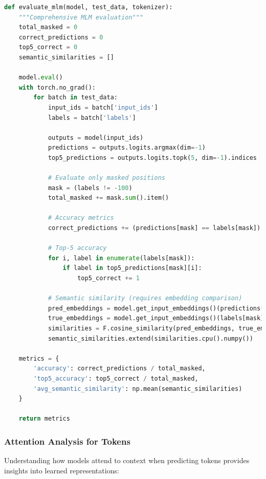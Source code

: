 \begin{lstlisting}[language=Python, caption=MLM evaluation metrics]
def evaluate_mlm(model, test_data, tokenizer):
    """Comprehensive MLM evaluation"""
    total_masked = 0
    correct_predictions = 0
    top5_correct = 0
    semantic_similarities = []
    
    model.eval()
    with torch.no_grad():
        for batch in test_data:
            input_ids = batch['input_ids']
            labels = batch['labels']
            
            outputs = model(input_ids)
            predictions = outputs.logits.argmax(dim=-1)
            top5_predictions = outputs.logits.topk(5, dim=-1).indices
            
            # Evaluate only masked positions
            mask = (labels != -100)
            total_masked += mask.sum().item()
            
            # Accuracy metrics
            correct_predictions += (predictions[mask] == labels[mask]).sum().item()
            
            # Top-5 accuracy
            for i, label in enumerate(labels[mask]):
                if label in top5_predictions[mask][i]:
                    top5_correct += 1
            
            # Semantic similarity (requires embedding comparison)
            pred_embeddings = model.get_input_embeddings()(predictions[mask])
            true_embeddings = model.get_input_embeddings()(labels[mask])
            similarities = F.cosine_similarity(pred_embeddings, true_embeddings)
            semantic_similarities.extend(similarities.cpu().numpy())
    
    metrics = {
        'accuracy': correct_predictions / total_masked,
        'top5_accuracy': top5_correct / total_masked,
        'avg_semantic_similarity': np.mean(semantic_similarities)
    }
    
    return metrics
\end{lstlisting}

\subsubsection{Attention Analysis for \mask{} Tokens}

Understanding how models attend to context when predicting \mask{} tokens provides insights into learned representations:

